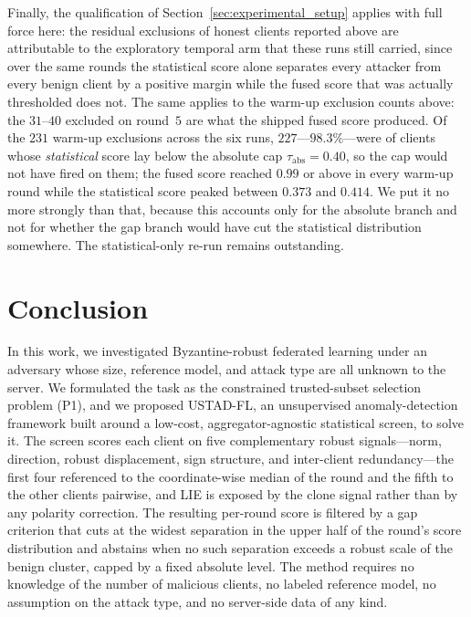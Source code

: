 \documentclass[journal]{IEEEtran}
\begin{document}
Finally, the qualification of Section~\ref{sec:experimental_setup} applies with full force here: the residual exclusions of honest clients reported above are attributable to the exploratory temporal arm that these runs still carried, since over the same rounds the statistical score alone separates every attacker from every benign client by a positive margin while the fused score that was actually thresholded does not. The same applies to the warm-up exclusion counts above: the $31$--$40$ excluded on round~$5$ are what the shipped fused score produced. Of the $231$ warm-up exclusions across the six runs, $227$---$98.3\%$---were of clients whose \emph{statistical} score lay below the absolute cap $\tau_{\mathrm{abs}} = 0.40$, so the cap would not have fired on them; the fused score reached $0.99$ or above in every warm-up round while the statistical score peaked between $0.373$ and $0.414$. We put it no more strongly than that, because this accounts only for the absolute branch and not for whether the gap branch would have cut the statistical distribution somewhere. The statistical-only re-run remains outstanding.


\section{Conclusion}
\label{sec:conclusion}

In this work, we investigated Byzantine-robust federated learning under an adversary whose size, reference model, and attack type are all unknown to the server. We formulated the task as the constrained trusted-subset selection problem (P1), and we proposed USTAD-FL, an unsupervised anomaly-detection framework built around a low-cost, aggregator-agnostic statistical screen, to solve it. The screen scores each client on five complementary robust signals---norm, direction, robust displacement, sign structure, and inter-client redundancy---the first four referenced to the coordinate-wise median of the round and the fifth to the other clients pairwise, and LIE is exposed by the clone signal rather than by any polarity correction. The resulting per-round score is filtered by a gap criterion that cuts at the widest separation in the upper half of the round's score distribution and abstains when no such separation exceeds a robust scale of the benign cluster, capped by a fixed absolute level. The method requires no knowledge of the number of malicious clients, no labeled reference model, no assumption on the attack type, and no server-side data of any kind.
\end{document}
